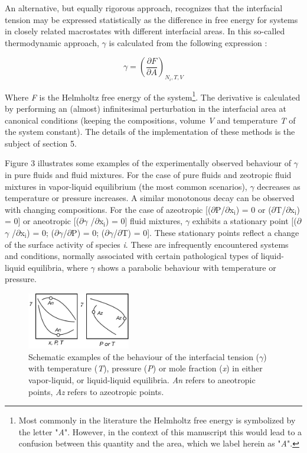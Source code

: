 \documentclass[9pt,bestpractices]{livecoms}
\begin{document}
An alternative, but equally rigorous approach, recognizes that the interfacial
tension may be expressed statistically as the difference in free energy for
systems in closely related macrostates with different interfacial areas. In
this so-called thermodynamic approach, $\gamma$ is calculated from the
following expression \citep{gray2011,gloor2005,errington2007}:

\begin{equation}
\gamma=\left(\frac{\partial F}{\partial A}\right)_{N_{i},T,V}
\end{equation}

Where \textit{F} is the Helmholtz free energy of the system\footnote{
Most commonly in the literature the Helmholtz free energy is symbolized by the
letter "\textit{A}". However, in the context of this manuscript this would lead
to a confusion between this quantity and the area, which we label herein as
"\textit{A}".}.  The derivative is calculated by performing an (almost)
infinitesimal perturbation in the interfacial area at canonical conditions
(keeping the compositions, volume \textit{V} and temperature \textit{T} of the
system constant). The details of the implementation of these methods is the
subject of section 5.

Figure 3 illustrates some examples of the experimentally observed behaviour of
$\gamma$ in pure fluids and fluid mixtures. For the case of pure fluids and
zeotropic fluid mixtures in vapor-liquid equilibrium (the most common
scenarios), {${\gamma}$} decreases as temperature or pressure increases.
A similar monotonous decay can be observed with changing compositions. For the
case of azeotropic [(${\partial}$P/${\partial}$x$_{\mathrm{i}}$) = 0 or
(${\partial}$T/${\partial}$x$_{\mathrm{i}}$) = 0] or aneotropic
[(${\partial}${${\gamma}$} /${\partial}$x$_{\mathrm{i}}$) = 0] fluid mixtures,
{${\gamma}$} exhibits a stationary point [(${\partial}${${\gamma}$}
/${\partial}$x$_{\mathrm{i}}$) = 0; (${\partial}${${\gamma}$}/${\partial}$P)
= 0; (${\partial}${${\gamma}$}/${\partial}$T) = 0]. These stationary points
reflect a change of the surface activity of species \textit{i}. These are
infrequently encountered systems and conditions, normally associated with
certain pathological types of liquid-liquid equilibria, where {${\gamma}$} shows a parabolic
behaviour with temperature or pressure.
\begin{figure}
  \centering
  \includegraphics[width=0.4\textwidth]{gfx/image7.png}
  \caption{Schematic examples of the behaviour of the interfacial tension ({${\gamma}$}) with temperature (\textit{T}), pressure (\textit{P}) or mole fraction (\textit{x}) in either vapor-liquid, or liquid-liquid equilibria. \textit{An} refers to aneotropic points, \textit{Az} refers to azeotropic points.}
  \label{fig:2}
\end{figure}
\end{document}
